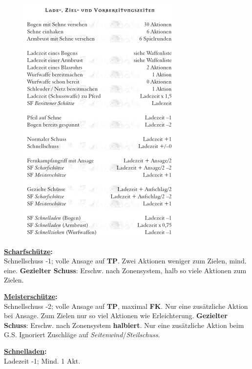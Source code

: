 {\begin{figure}[H]
\includegraphics[width=.9\linewidth]{Kampf/Angriff/ladezeiten.png}
\end{figure}
\textbf{\underline{Scharfschütze}:}\\
Schnellschuss -1; volle Ansage auf \textbf{TP}. Zwei Aktionen weniger zum
Zielen, mind. eine. \textbf{Gezielter Schuss}: Erschw. nach Zonensystem, halb
so viele Aktionen zum Zielen.

\textbf{\underline{Meisterschütze}:}\\
Schnellschuss -2; volle Ansage auf \textbf{TP}, maximal \textbf{FK}. Nur eine
zusätzliche Aktion bei Ansage. Zum Zielen nur so viel Aktionen wie
Erleichterung. \textbf{Gezielter Schuss}: Erschw. nach Zonensystem
\textbf{halbiert}. Nur eine zusätzliche Aktion beim G.S. Ignoriert Zuschläge
auf \textit{Seitenwind}/\textit{Steilschuss}.

\textbf{\underline{Schnelladen}:}\\
Ladezeit -1; Mind. 1 Akt.
}
